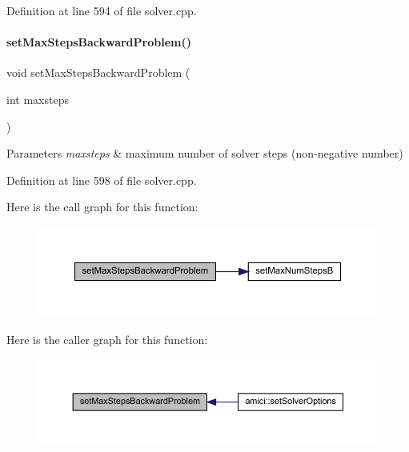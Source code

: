Definition at line 594 of file solver.\+cpp.

\mbox{\label{classamici_1_1_solver_aa1d39cd744f489c17c3497c98acb7f59}} 
\paragraph{\texorpdfstring{set\+Max\+Steps\+Backward\+Problem()}{setMaxStepsBackwardProblem()}}
{\footnotesize\ttfamily void set\+Max\+Steps\+Backward\+Problem (\begin{DoxyParamCaption}\item[{int}]{maxsteps }\end{DoxyParamCaption})}


\begin{DoxyParams}{Parameters}
{\em maxsteps} & maximum number of solver steps (non-\/negative number) \\
\hline
\end{DoxyParams}


Definition at line 598 of file solver.\+cpp.

Here is the call graph for this function\+:
\nopagebreak
\begin{figure}[H]
\begin{center}
\leavevmode
\includegraphics[width=350pt]{classamici_1_1_solver_aa1d39cd744f489c17c3497c98acb7f59_cgraph}
\end{center}
\end{figure}
Here is the caller graph for this function\+:
\nopagebreak
\begin{figure}[H]
\begin{center}
\leavevmode
\includegraphics[width=350pt]{classamici_1_1_solver_aa1d39cd744f489c17c3497c98acb7f59_icgraph}
\end{center}
\end{figure}
\mbox{\label{classamici_1_1_solver_a60631d9a18e29c1102cae7cb77b9918c}} 
